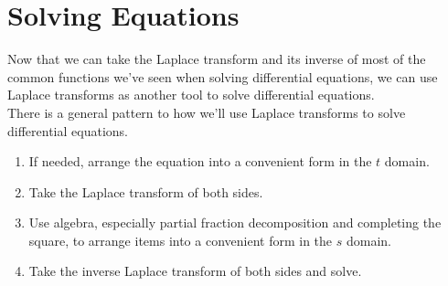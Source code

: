 \section{Solving Equations}
\noindent
Now that we can take the Laplace transform and its inverse of most of the common functions we've seen when solving differential equations, we can use Laplace transforms as another tool to solve differential equations.\\

\noindent
There is a general pattern to how we'll use Laplace transforms to solve differential equations.
\begin{enumerate}[label=\arabic*)]
	\item If needed, arrange the equation into a convenient form in the $t$ domain.
	\item Take the Laplace transform of both sides.
	\item Use algebra, especially partial fraction decomposition and completing the square, to arrange items into a convenient form in the $s$ domain.
	\item Take the inverse Laplace transform of both sides and solve.
\end{enumerate}

\ifodd{}\fi